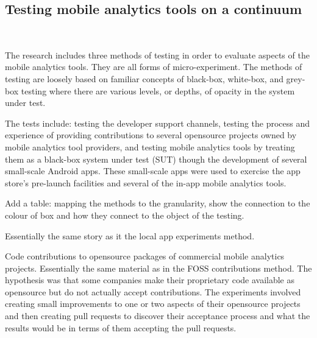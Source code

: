 \subsection{Testing mobile analytics tools on a continuum}~\label{section-testing-mobile-analytics-tools-on-a-continuum}


 The research includes three methods of testing in order to evaluate aspects of the mobile analytics tools. 
 They are all forms of micro-experiment. The methods of testing are loosely based on familiar concepts of black-box, white-box, and grey-box testing where there are various levels, or depths, of opacity in the system under test.

The tests include: testing the developer support channels, testing the process and experience of providing contributions to several opensource projects owned by mobile analytics tool providers, and testing mobile analytics tools by treating them as a black-box system under test (SUT) though the development of several small-scale Android apps. These small-scale apps were used to exercise the app store's pre-launch facilities and several of the in-app mobile analytics tools. 

Add a table: mapping the methods to the granularity, show the connection to the colour of box and how they connect to the object of the testing.




Essentially the same story as it the local app experiments method.

Code contributions to opensource packages of commercial mobile analytics projects.
%
Essentially the same material as in the FOSS contributions method. The hypothesis was that some companies make their proprietary code available as opensource but do not actually accept contributions. The experiments involved creating small improvements to one or two aspects of their opensource projects and then creating pull requests to discover their acceptance process and what the results would be in terms of them accepting the pull requests.

